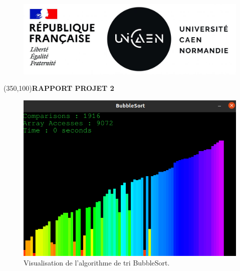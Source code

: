 \documentclass[10pt,a4paper]{article}
\begin{document}
\begin{titlepage}

\begin{figure}[t]
\includegraphics[scale=0.15]{img/unicaen.jpg}
\raggedleft
\end{figure}

\Large{\framebox(350,100){\textbf{RAPPORT PROJET 2 }}}\\

\begin{figure}[h]
\includegraphics[scale=0.6]{img/view.png}
\caption{Visualisation de l'algorithme de tri BubbleSort.}
\label{fig:votre_image}
\centering
\end{figure}

 \\



\thispagestyle{empty}
\setcounter{page}{0}

\end{titlepage}
\end{document}
